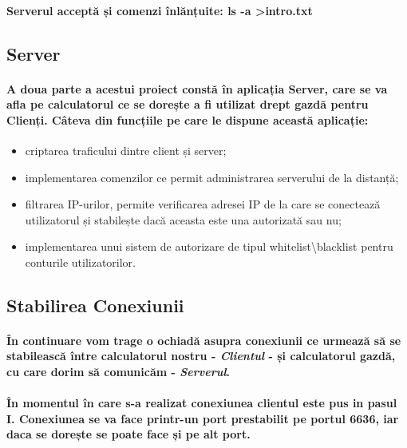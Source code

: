 \documentclass{article}
\begin{document}
	\paragraph{Serverul acceptă și comenzi înlănțuite: ls -a \textgreater  intro.txt}
	
	
	\subsection{Server}
	
	\paragraph{
		A doua parte a acestui proiect constă în aplicația Server, care se va afla pe calculatorul ce se dorește a fi utilizat drept gazdă pentru Clienți. Câteva din funcțiile pe care le dispune această aplicație:	
	}
	
	\begin{itemize}
		\item criptarea traficului dintre client și server;
		\item implementarea comenzilor ce permit administrarea serverului de la distanță;
		\item filtrarea IP-urilor, permite verificarea adresei IP de la care se conectează utilizatorul și stabilește dacă aceasta este una autorizată sau nu;
		\item implementarea unui sistem de autorizare de tipul whitelist\textbackslash blacklist pentru conturile utilizatorilor.
	\end{itemize}
	
	\subsection{Stabilirea Conexiunii}
	
	\paragraph{
		În continuare vom trage o ochiadă asupra conexiunii ce urmează să se stabilească între calculatorul nostru - \textit{Clientul} - și calculatorul gazdă, cu care dorim să comunicăm - \textit{Serverul}.
	}

	
	\paragraph{
		În momentul în care s-a realizat conexiunea clientul este pus in pasul I. Conexiunea se va face printr-un port prestabilit pe portul 6636, iar daca se dorește se poate face și pe alt port.
	}
	
\end{document}

